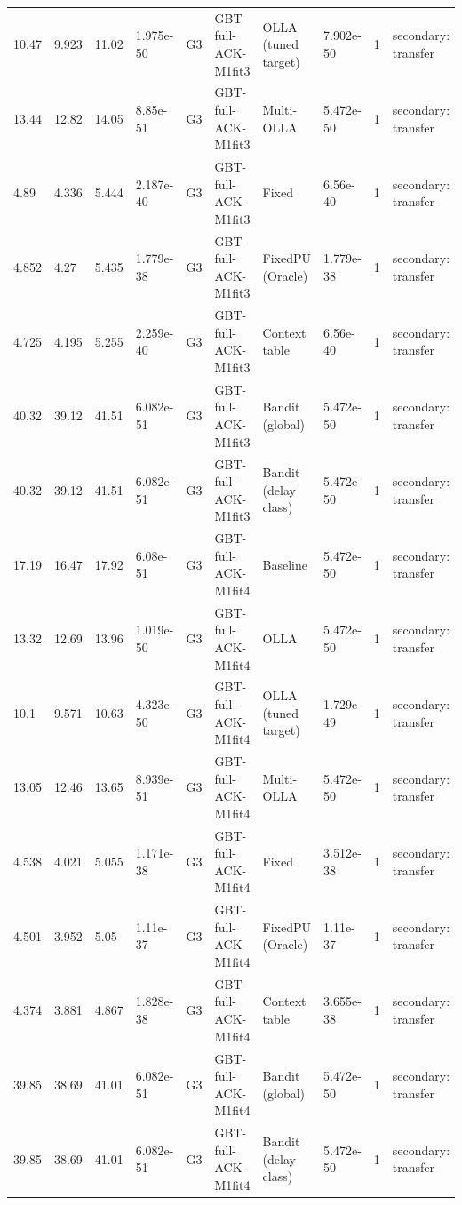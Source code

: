 \documentclass[10pt]{article}
\begin{document}
\begin{landscape}
\begin{longtable}{@{}llllllllll@{}}
10.47 & 9.923 & 11.02 & 1.975e-50 & G3 & GBT-full-ACK-M1fit3 & OLLA (tuned target) & 7.902e-50 & 1 & secondary: transfer \\
13.44 & 12.82 & 14.05 & 8.85e-51 & G3 & GBT-full-ACK-M1fit3 & Multi-OLLA & 5.472e-50 & 1 & secondary: transfer \\
4.89 & 4.336 & 5.444 & 2.187e-40 & G3 & GBT-full-ACK-M1fit3 & Fixed & 6.56e-40 & 1 & secondary: transfer \\
4.852 & 4.27 & 5.435 & 1.779e-38 & G3 & GBT-full-ACK-M1fit3 & FixedPU (Oracle) & 1.779e-38 & 1 & secondary: transfer \\
4.725 & 4.195 & 5.255 & 2.259e-40 & G3 & GBT-full-ACK-M1fit3 & Context table & 6.56e-40 & 1 & secondary: transfer \\
40.32 & 39.12 & 41.51 & 6.082e-51 & G3 & GBT-full-ACK-M1fit3 & Bandit (global) & 5.472e-50 & 1 & secondary: transfer \\
40.32 & 39.12 & 41.51 & 6.082e-51 & G3 & GBT-full-ACK-M1fit3 & Bandit (delay class) & 5.472e-50 & 1 & secondary: transfer \\
17.19 & 16.47 & 17.92 & 6.08e-51 & G3 & GBT-full-ACK-M1fit4 & Baseline & 5.472e-50 & 1 & secondary: transfer \\
13.32 & 12.69 & 13.96 & 1.019e-50 & G3 & GBT-full-ACK-M1fit4 & OLLA & 5.472e-50 & 1 & secondary: transfer \\
10.1 & 9.571 & 10.63 & 4.323e-50 & G3 & GBT-full-ACK-M1fit4 & OLLA (tuned target) & 1.729e-49 & 1 & secondary: transfer \\
13.05 & 12.46 & 13.65 & 8.939e-51 & G3 & GBT-full-ACK-M1fit4 & Multi-OLLA & 5.472e-50 & 1 & secondary: transfer \\
4.538 & 4.021 & 5.055 & 1.171e-38 & G3 & GBT-full-ACK-M1fit4 & Fixed & 3.512e-38 & 1 & secondary: transfer \\
4.501 & 3.952 & 5.05 & 1.11e-37 & G3 & GBT-full-ACK-M1fit4 & FixedPU (Oracle) & 1.11e-37 & 1 & secondary: transfer \\
4.374 & 3.881 & 4.867 & 1.828e-38 & G3 & GBT-full-ACK-M1fit4 & Context table & 3.655e-38 & 1 & secondary: transfer \\
39.85 & 38.69 & 41.01 & 6.082e-51 & G3 & GBT-full-ACK-M1fit4 & Bandit (global) & 5.472e-50 & 1 & secondary: transfer \\
39.85 & 38.69 & 41.01 & 6.082e-51 & G3 & GBT-full-ACK-M1fit4 & Bandit (delay class) & 5.472e-50 & 1 & secondary: transfer \\
\bottomrule
\end{longtable}
\normalsize
\tiny

\end{landscape}
\end{document}
